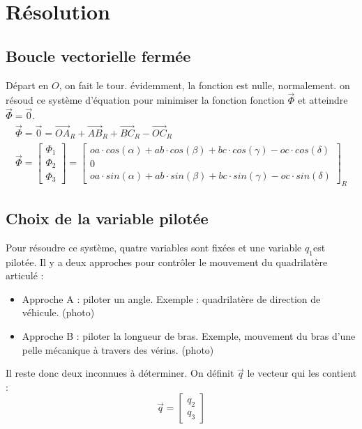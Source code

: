 \documentclass[12pt,a4paper]{article}
\begin{document}
\section{Résolution}
\subsection{Boucle vectorielle fermée}
Départ en $O$, on fait le tour. évidemment, la fonction est nulle, normalement. on résoud ce système d'équation pour minimiser la fonction fonction $\vec{\Phi}$ et atteindre $\vec{\Phi}=\vec{0}$.
\begin{eqnarray}
\vec{\Phi}=\vec{0}=\vec{OA}_R + \vec{AB}_R + \vec{BC}_R - \vec{OC}_R\\
\vec{\Phi}=
\begin{bmatrix}
\Phi_1\\
\Phi_2\\
\Phi_3
\end{bmatrix}=
\begin{bmatrix}
oa \cdot cos(\alpha) +ab \cdot cos(\beta)+bc \cdot cos(\gamma)-oc \cdot cos(\delta)\\
0\\
oa \cdot sin(\alpha) + ab \cdot sin(\beta)+bc \cdot sin(\gamma)-oc \cdot sin(\delta)  
\end{bmatrix}_{R}
\end{eqnarray}

\subsection{Choix de la variable pilotée}
Pour résoudre ce système, quatre variables sont fixées et une variable $q_1$est pilotée.
Il y a deux approches pour contrôler le mouvement du quadrilatère articulé : 
\begin{itemize}
	\item Approche A : piloter un angle. Exemple : quadrilatère de direction de véhicule. (photo)
	\item Approche B : piloter la longueur de bras. Exemple, mouvement du bras d'une pelle mécanique à travers des vérins. (photo)
\end{itemize}
Il reste donc deux inconnues à déterminer. On définit $\vec{q}$ le vecteur qui les contient :
\begin{equation}
\vec{q}=\begin{bmatrix}
q_2\\
q_3
\end{bmatrix}
\end{equation}
\end{document}
